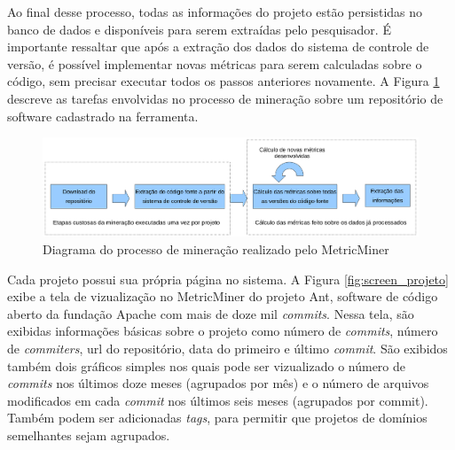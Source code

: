 \documentclass[a4paper, 12pt, twoside]{book}
\begin{document}
        Ao final desse processo, todas as informações do projeto estão persistidas no banco de dados 
        e disponíveis para serem extraídas pelo pesquisador. É importante ressaltar que após a 
        extração dos dados do sistema de controle de versão, é possível implementar novas métricas 
        para serem calculadas sobre o código, sem precisar executar todos os passos anteriores 
        novamente. A Figura \ref{fig:diagrama} descreve as tarefas envolvidas no processo de 
        mineração sobre um repositório de software cadastrado na ferramenta.

        \begin{figure}[ht]
            \centering
            \includegraphics[width=1.0\textwidth]{img/diagrama.png}
            \caption{Diagrama do processo de mineração realizado pelo MetricMiner}
            \label{fig:diagrama}
        \end{figure}

        Cada projeto possui sua própria página no sistema. A Figura \ref{fig:screen_projeto} exibe a 
        tela de vizualização no MetricMiner do projeto Ant, software de código aberto da fundação     
        Apache com mais de doze mil \textit{commits}. Nessa tela, são exibidas informações básicas 
        sobre o projeto como número de \textit{commits}, número de \textit{commiters}, url do 
        repositório, data do primeiro e último \textit{commit}. São exibidos também dois gráficos 
        simples nos quais pode ser vizualizado o número de \textit{commits} nos últimos doze meses 
        (agrupados por mês) e o número de arquivos modificados em cada \textit{commit} nos últimos 
        seis meses (agrupados por commit). Também podem ser adicionadas \textit{tags},
        para permitir que projetos de domínios semelhantes sejam agrupados.
    
\end{document}
